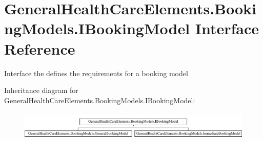 \hypertarget{interface_general_health_care_elements_1_1_booking_models_1_1_i_booking_model}{}\section{General\+Health\+Care\+Elements.\+Booking\+Models.\+I\+Booking\+Model Interface Reference}
\label{interface_general_health_care_elements_1_1_booking_models_1_1_i_booking_model}


Interface the defines the requirements for a booking model  


Inheritance diagram for General\+Health\+Care\+Elements.\+Booking\+Models.\+I\+Booking\+Model\+:\begin{figure}[H]
\begin{center}
\leavevmode
\includegraphics[height=1.372549cm]{interface_general_health_care_elements_1_1_booking_models_1_1_i_booking_model}
\end{center}
\end{figure}
